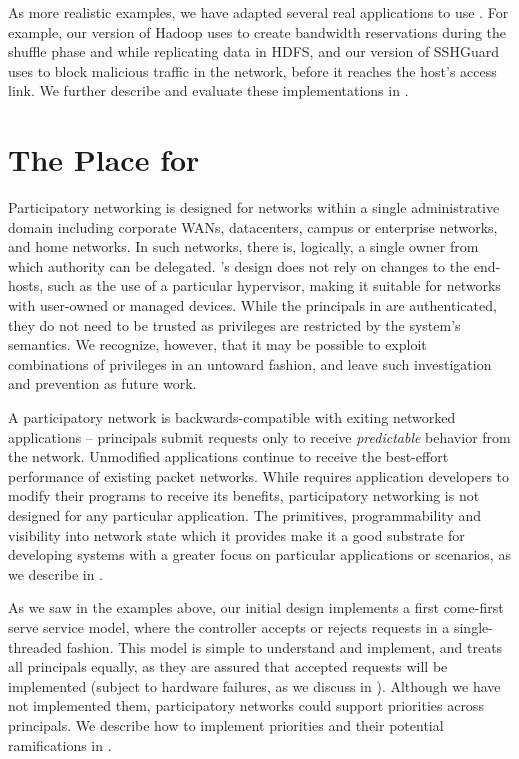 As more realistic examples, we have adapted several real applications to use
\sys. For example, our version of Hadoop uses \sys to create bandwidth
reservations during the shuffle phase and while replicating data in HDFS,
and our version of SSHGuard uses \sys to block malicious
traffic in the network, before it reaches the host's access link.
We further describe and evaluate these implementations
in .


\section{The Place for \sys}

Participatory networking is designed for networks within a single administrative
domain including corporate WANs, datacenters, campus or enterprise networks,
and home networks. In such networks, there is, logically, a single owner from
which authority can be delegated. \sys's design does not rely on changes
to the end-hosts, such as the use of a particular hypervisor, making it suitable
for networks with user-owned or managed devices.
While the principals in \sys are authenticated, they do not need to be trusted
as privileges are restricted by the system's semantics. We recognize, however,
that it may be possible to exploit combinations of privileges in an untoward fashion,
and leave such investigation and prevention as future work.

A participatory network is backwards-compatible with exiting networked
applications -- principals submit requests only to receive \emph{predictable}
behavior from the network. Unmodified applications continue to receive the
best-effort performance of existing packet networks.
While \sys requires application developers to modify their programs
to receive its benefits, participatory networking is not designed for
any particular application. The primitives, programmability and visibility
into network state which it provides make it a good substrate for developing 
systems with a greater focus on particular applications or scenarios, as
we describe in .

As we saw in the examples above, our initial design implements a first
come-first serve service model, where the controller accepts or rejects requests
in a single-threaded fashion. This model is simple to understand and implement,
and treats all principals equally, as they are assured that
accepted requests will be implemented (subject to hardware failures, as we
discuss in ). Although we have not
implemented them, participatory networks could support priorities across
principals. We describe how to implement priorities and their potential
ramifications in .

